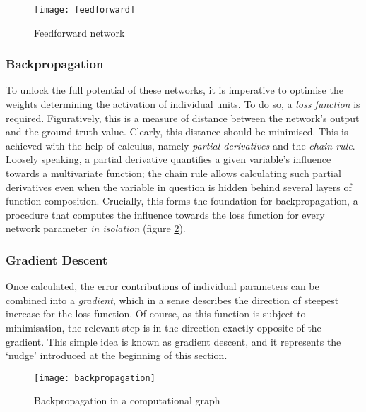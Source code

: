 \documentclass[../../report.tex]{subfiles}
\begin{document}
\begin{figure}
  \centering
  \texttt{[image: feedforward]}
  \caption{Feedforward network}
  \label{fig:feedforward}
\end{figure}

\subsubsection{Backpropagation}
To unlock the full potential of these networks, it is imperative to optimise the
weights determining the activation of individual units. To do so, a \emph{loss
function} is required. Figuratively, this is a measure of distance between the
network's output and the ground truth value. Clearly, this distance should be
minimised. This is achieved with the help of calculus, namely \emph{partial
derivatives} and the \emph{chain rule}. Loosely speaking, a partial derivative
quantifies a given variable's influence towards a multivariate function; the
chain rule allows calculating such partial derivatives even when the variable in
question is hidden behind several layers of function composition. Crucially,
this forms the foundation for backpropagation, a procedure that computes the
influence towards the loss function for every network parameter \emph{in
isolation} (figure \ref{fig:backpropagation}).

\subsubsection{Gradient Descent}
Once calculated, the error contributions of individual parameters can be
combined into a \emph{gradient}, which in a sense describes the direction of
steepest increase\footnotemark{} for the loss function. Of course, as this
function is subject to minimisation, the relevant step is in the direction
exactly opposite of the gradient. This simple idea is known as gradient descent,
and it represents the `nudge' introduced at the beginning of this section.


\begin{figure}
  \centering
  \texttt{[image: backpropagation]}
  \caption{Backpropagation in a computational graph \cite{Olah2015Backprop}}
  \label{fig:backpropagation}
\end{figure}
\end{document}
